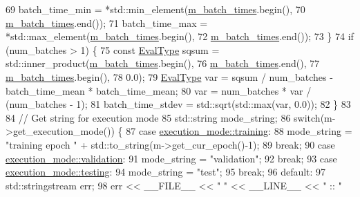 \begin{DoxyCode}
69     batch\_time\_min = *std::min\_element(\hyperlink{classlbann_1_1lbann__callback__timer_ae20dcc6bf921444e2724478ba751ade1}{m\_batch\_times}.begin(),
70                                        \hyperlink{classlbann_1_1lbann__callback__timer_ae20dcc6bf921444e2724478ba751ade1}{m\_batch\_times}.end());
71     batch\_time\_max = *std::max\_element(\hyperlink{classlbann_1_1lbann__callback__timer_ae20dcc6bf921444e2724478ba751ade1}{m\_batch\_times}.begin(),
72                                        \hyperlink{classlbann_1_1lbann__callback__timer_ae20dcc6bf921444e2724478ba751ade1}{m\_batch\_times}.end());
73   \}
74   \textcolor{keywordflow}{if} (num\_batches > 1) \{
75     \textcolor{keyword}{const} \hyperlink{base_8hpp_a3266f5ac18504bbadea983c109566867}{EvalType} sqsum = std::inner\_product(\hyperlink{classlbann_1_1lbann__callback__timer_ae20dcc6bf921444e2724478ba751ade1}{m\_batch\_times}.begin(),
76                                             \hyperlink{classlbann_1_1lbann__callback__timer_ae20dcc6bf921444e2724478ba751ade1}{m\_batch\_times}.end(),
77                                             \hyperlink{classlbann_1_1lbann__callback__timer_ae20dcc6bf921444e2724478ba751ade1}{m\_batch\_times}.begin(),
78                                             0.0);
79     \hyperlink{base_8hpp_a3266f5ac18504bbadea983c109566867}{EvalType} var = sqsum / num\_batches - batch\_time\_mean * batch\_time\_mean;
80     var = num\_batches * var / (num\_batches - 1);
81     batch\_time\_stdev = std::sqrt(std::max(var, 0.0));
82   \}
83 
84   \textcolor{comment}{// Get string for execution mode}
85   std::string mode\_string;
86   \textcolor{keywordflow}{switch}(m->get\_execution\_mode()) \{
87   \textcolor{keywordflow}{case} \hyperlink{base_8hpp_a2781a159088df64ed7d47cc91c4dc0a8ac185ddac8b5a8f5aa23c5b80bc12d214}{execution\_mode::training}:
88     mode\_string = \textcolor{stringliteral}{"training epoch "} + std::to\_string(m->get\_cur\_epoch()-1);
89     \textcolor{keywordflow}{break};
90   \textcolor{keywordflow}{case} \hyperlink{base_8hpp_a2781a159088df64ed7d47cc91c4dc0a8aa617908b172c473cb8e8cda059e55bf0}{execution\_mode::validation}:
91     mode\_string = \textcolor{stringliteral}{"validation"};
92     \textcolor{keywordflow}{break};
93   \textcolor{keywordflow}{case} \hyperlink{base_8hpp_a2781a159088df64ed7d47cc91c4dc0a8aae2b1fca515949e5d54fb22b8ed95575}{execution\_mode::testing}:
94     mode\_string = \textcolor{stringliteral}{"test"};
95     \textcolor{keywordflow}{break};
96   \textcolor{keywordflow}{default}:
97     std::stringstream err;
98     err << \_\_FILE\_\_ << \textcolor{stringliteral}{" "} << \_\_LINE\_\_ << \textcolor{stringliteral}{" :: "}

\end{DoxyCode}
